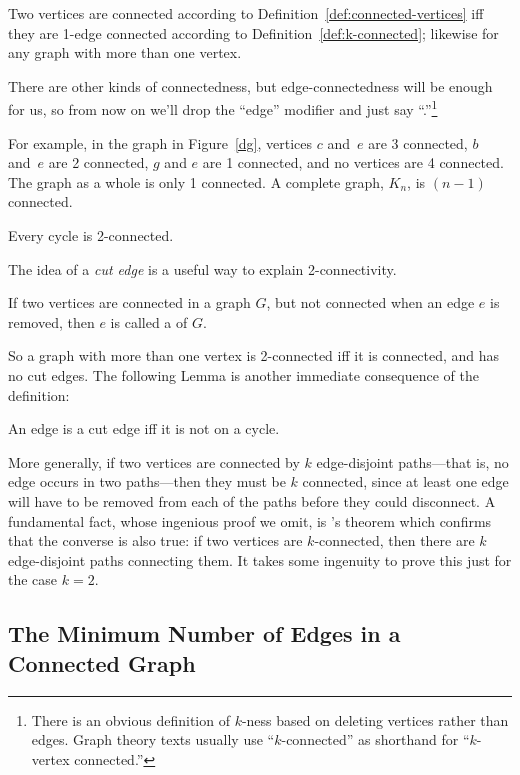 Two vertices are connected according to
Definition~\ref{def:connected-vertices} iff they are 1-edge connected
according to Definition~\ref{def:k-connected}; likewise for any graph
with more than one vertex.

There are other kinds of connectedness, but edge-connectedness will be
enough for us, so from now on we'll drop the ``edge'' modifier and
just say ``.''\footnote{There is an obvious definition
  of $k$-ness based on
  deleting vertices rather than edges.  Graph theory texts usually use
  ``$k$-connected'' as shorthand for ``$k$-vertex connected.''}

For example, in the graph in Figure~\ref{dg}, vertices $c$ and~$e$ are
3 connected, $b$ and~$e$ are 2 connected, $g$ and $e$ are 1 connected,
and no vertices are 4 connected.  The graph as a whole is only 1
connected.  A complete graph, $K_n$, is $(n-1)$ connected.
\begin{editingnotes}
\end{editingnotes}
Every cycle is 2-connected.

The idea of a \emph{cut edge} is a useful way to explain 2-connectivity.
\begin{definition}
If two vertices are connected in a graph $G$, but not connected when
an edge $e$ is removed, then $e$ is called a  of $G$.
\end{definition}
So a graph with more than one vertex is 2-connected iff it is
connected, and has no cut edges.  The following Lemma is
another immediate consequence of the definition:
\begin{lemma}\label{lem:cutiffcycle}
An edge is a cut edge iff it is not on a cycle.
\end{lemma}

More generally, if two vertices are connected by $k$ edge-disjoint
paths---that is, no edge occurs in two paths---then they must
be $k$ connected, since at least one edge will have to be removed from
each of the paths before they could disconnect.  A fundamental fact,
whose ingenious proof we omit, is 's theorem which
confirms that the converse is also true: if two vertices are
$k$-connected, then there are $k$ edge-disjoint paths connecting them.
It takes some ingenuity to prove this just for the case $k=2$.

\subsection{The Minimum Number of Edges in a Connected Graph}

